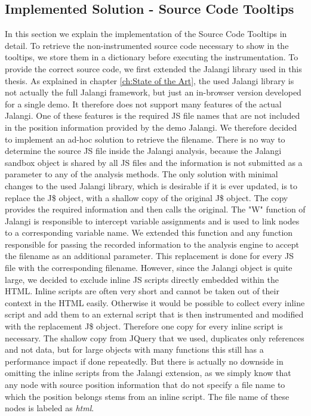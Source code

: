 \subsection{Implemented Solution - Source Code Tooltips}
In this section we explain the implementation of the Source Code Tooltips in detail. To retrieve the non-instrumented source code necessary to show in the tooltips, we store them in a dictionary before executing the instrumentation. To provide the correct source code, we first extended the Jalangi library used in this thesis. As explained in chapter \ref{ch:State of the Art}, the used Jalangi library is not actually the full Jalangi framework, but just an in-browser version developed for a single demo. It therefore does not support many features of the actual Jalangi. One of these features is the required JS file names that are not included in the position information provided by the demo Jalangi. We therefore decided to implement an ad-hoc solution to retrieve the filename. There is no way to determine the source JS file inside the Jalangi analysis, because the Jalangi sandbox object is shared by all JS files and the information is not submitted as a parameter to any of the analysis methods. The only solution with minimal changes to the used Jalangi library, which is desirable if it is ever updated, is to replace the J\$ object, with a shallow copy of the original J\$ object. The copy provides the required information and then calls the original. The "W" function of Jalangi is responsible to intercept variable assignments and is used to link nodes to a corresponding variable name. We extended this function and any function responsible for passing the recorded information to the analysis engine to accept the filename as an additional parameter. This replacement is done for every JS file with the corresponding filename. However, since the Jalangi object is quite large, we decided to exclude inline JS scripts directly embedded within the HTML. Inline scripts are often very short and cannot be taken out of their context in the HTML easily. Otherwise it would be possible to collect every inline script and add them to an external script that is then instrumented and modified with the replacement J\$ object. Therefore one copy for every inline script is necessary. The shallow copy from JQuery that we used, duplicates only references and not data, but for large objects with many functions this still has a performance impact if done repeatedly. But there is actually no downside in omitting the inline scripts from the Jalangi extension, as we simply know that any node with source position information that do not specify a file name to which the position belongs stems from an inline script. The file name of these nodes is labeled as \emph{html}.\\
